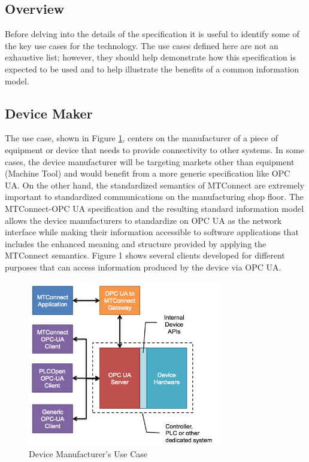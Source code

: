 \documentclass{mtconnect}	%
\begin{document}
\subsection{Overview}

Before delving into the details of the specification it is useful to identify some of the key use cases for the technology. The use cases defined here are not an exhaustive list; however, they should help demonstrate how this specification is expected to be used and to help illustrate the benefits of a common information model.

\subsection{Device Maker}

The use case, shown in Figure \ref{fig:device_mfg_use_case}, centers on the manufacturer of a piece of equipment or device that needs to provide connectivity to other systems. In some cases, the device manufacturer will be targeting markets other than equipment (Machine Tool) and would benefit from a more generic specification like OPC UA. On the other hand, the standardized semantics of MTConnect are extremely important to standardized communications on the manufacturing shop floor. The MTConnect-OPC UA specification and the resulting standard information model allows the device manufacturers to standardize on OPC UA as the network interface while making their information accessible to software applications that includes the enhanced meaning and structure provided by applying the MTConnect semantics. Figure 1 shows several clients developed for different purposes that can access information produced by the device via OPC UA.

\begin{figure}[h]
  \centering
  \includegraphics[width=0.75\textwidth]{diagrams/DeviceManufacturingUseCase.png}
  \caption{Device Manufacturer's Use Case}
  \label{fig:device_mfg_use_case}
\end{figure}
\end{document}
